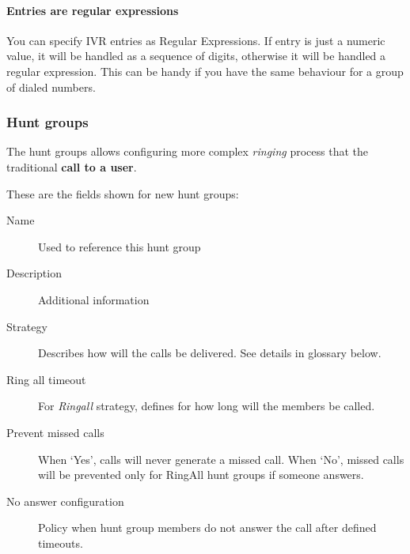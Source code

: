 \documentclass[letterpaper,10pt,english]{sphinxmanual}
\begin{document}
\paragraph{Entries are regular expressions}

You can specify IVR entries as Regular Expressions. If entry is just
a numeric value, it will be handled as a sequence of digits, otherwise it
will be handled a regular expression. This can be handy if you have the
same behaviour for a group of dialed numbers.


\subsubsection{Hunt groups}
\label{administration_portal/client/vpbx/routing_endpoints/hunt_groups:hunt-groups}\label{administration_portal/client/vpbx/routing_endpoints/hunt_groups::doc}\label{administration_portal/client/vpbx/routing_endpoints/hunt_groups:huntgroups}
The hunt groups allows configuring more complex \emph{ringing} process that the
traditional \textbf{call to a user}.

These are the fields shown for new hunt groups:
\begin{description}
\item[{Name}] \leavevmode{}\label{administration_portal/client/vpbx/routing_endpoints/hunt_groups:term-name}
Used to reference this hunt group

\item[{Description}] \leavevmode{}\label{administration_portal/client/vpbx/routing_endpoints/hunt_groups:term-description}
Additional information

\item[{Strategy}] \leavevmode{}\label{administration_portal/client/vpbx/routing_endpoints/hunt_groups:term-strategy}
Describes how will the calls be delivered. See details in glossary below.

\item[{Ring all timeout}] \leavevmode{}\label{administration_portal/client/vpbx/routing_endpoints/hunt_groups:term-ring-all-timeout}
For \emph{Ringall} strategy, defines for how long will the members be called.

\item[{Prevent missed calls}] \leavevmode{}\label{administration_portal/client/vpbx/routing_endpoints/hunt_groups:term-prevent-missed-calls}
When `Yes', calls will never generate a missed call. When `No', missed calls will be prevented only for RingAll
hunt groups if someone answers.

\item[{No answer configuration}] \leavevmode{}\label{administration_portal/client/vpbx/routing_endpoints/hunt_groups:term-no-answer-configuration}
Policy when hunt group members do not answer the call after defined timeouts.

\end{description}
\end{document}
